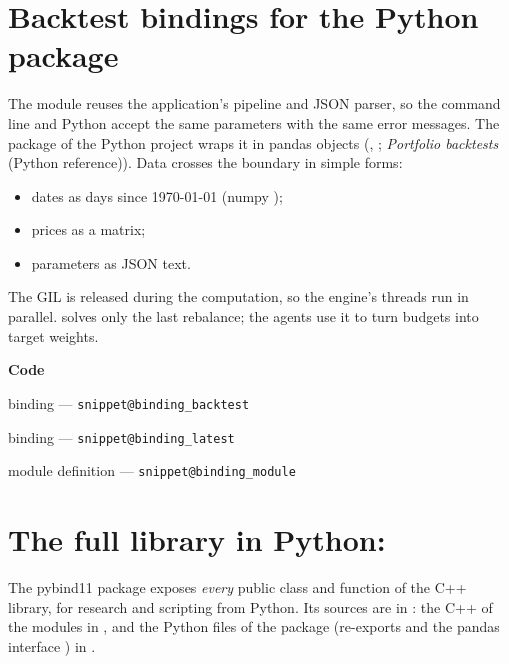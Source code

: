 \documentclass[11pt,a4paper]{article}
\makeatletter
\newcommand{\snippetsource}[1]{\csname snippet@#1\endcsname}
\newcommand{\snippet}[3]{%
  }
\newenvironment{codepointers}{%
  \par\smallskip\begingroup\footnotesize\noindent\textcolor{blue!50!black}{\textbf{Code}}\par\nopagebreak
  \begin{list}{}{\setlength{\leftmargin}{1.2em}\setlength{\itemsep}{0pt}\setlength{\parsep}{0pt}\setlength{\topsep}{1pt}}}%
  {\end{list}\endgroup\smallskip}
\newcommand{\codeitem}[2]{\item #2 --- \texttt{\snippetsource{#1}}}
\newcommand{\xref}[2]{\emph{#2} (#1 reference)}
\makeatother
\begin{document}
\section{Backtest bindings for the Python package}\label{sec:rbbindings}
The module  reuses the application's pipeline and
JSON parser, so the command line and Python accept the same parameters with the same error
messages. The  package of the Python project wraps it in pandas objects
(, ; \xref{Python}{Portfolio backtests}).
Data crosses the boundary in simple forms:
\begin{itemize}
  \item dates as  days since 1970-01-01 (numpy );
  \item prices as a  matrix;
  \item parameters as JSON text.
\end{itemize}
The GIL is released during the computation, so the engine's threads run in parallel.
 solves only the last rebalance; the agents use it to turn budgets into
target weights.
\snippet{binding_prepare}{C++}{Shared preparation: parse, align, window, returns, budgets}
\begin{codepointers}
  \codeitem{binding_backtest}{ binding}
  \codeitem{binding_latest}{ binding}
  \codeitem{binding_module}{module definition}
\end{codepointers}

\section{The full library in Python: \texorpdfstring{}{nabia\_python\_bridge}}\label{sec:bridge}

The pybind11 package  exposes \emph{every} public class and
function of the C++ library, for research and scripting from Python. Its sources are in
: the C++ of the modules in , and the Python files of the package
(re-exports and the pandas interface ) in .
\end{document}
